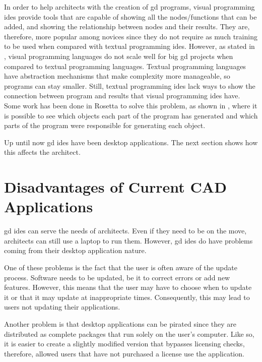 In order to help architects with the creation of \gls{gd} programs, visual programming \glspl{ide} provide tools that are capable of showing all the nodes/functions that can be added, and showing the relationship between nodes and their results.
They are, therefore, more popular among novices since they do not require as much training to be used when compared with textual programming \glspl{ide}.
However, as stated in \cite{leitao2012programming}, visual programming languages do not scale well for big \gls{gd} projects when compared to textual programming languages.
Textual programming languages have abstraction mechanisms that make complexity more manageable, so programs can stay smaller.
Still, textual programming \glspl{ide} lack ways to show the connection between program and results that visual programming \glspl{ide} have.
Some work has been done in Rosetta to solve this problem, as shown in \cite{Leitao2014illustrated}, where it is possible to see which objects each part of the program has generated and which parts of the program were responsible for generating each object.

Up until now \gls{gd} \glspl{ide} have been desktop applications.
The next section shows how this affects the architect.


\section{Disadvantages of Current CAD Applications}
\gls{gd} \glspl{ide} can serve the needs of architects. Even if they need to be on the move, architects can still use a laptop to run them. However, \gls{gd} \glspl{ide} do have problems coming from their desktop application nature.

One of these problems is the fact that the user is often aware of the update process. Software needs to be updated, be it to correct errors or add new features. However, this means that the user may have to choose when to update it or that it may update at inappropriate times. Consequently, this may lead to users not updating their applications.

Another problem is that desktop applications can be pirated since they are distributed as complete packages that run solely on the user's computer. Like so, it is easier to create a slightly modified version that bypasses licensing checks, therefore, allowed users that have not purchased a license use the application.

